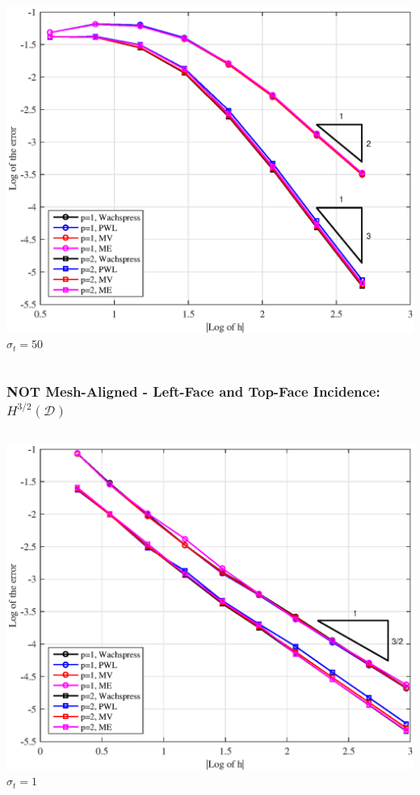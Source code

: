 \documentclass[compress,10pt]{beamer}
\begin{document}
\begin{frame}[t]
{\begin{columns}[c]
{}\includegraphics[width=\textwidth]{images/PAErr_LeftTop_SplitPoly_sig50.eps} \\
$\sigma_t = 50$
\end{columns}
}
{
\frametitle{NOT Mesh-Aligned -  Left-Face and Top-Face Incidence: $H^{3/2} (\mathcal{D})$}
\vspace{1.00cm}
\begin{columns}[c]
\centering
{}\includegraphics[width=\textwidth]{images/PAErr_LeftTop_Poly_sig1.eps} \\
$\sigma_t = 1$
\centering

\end{columns}}
\end{frame}
\end{document}
